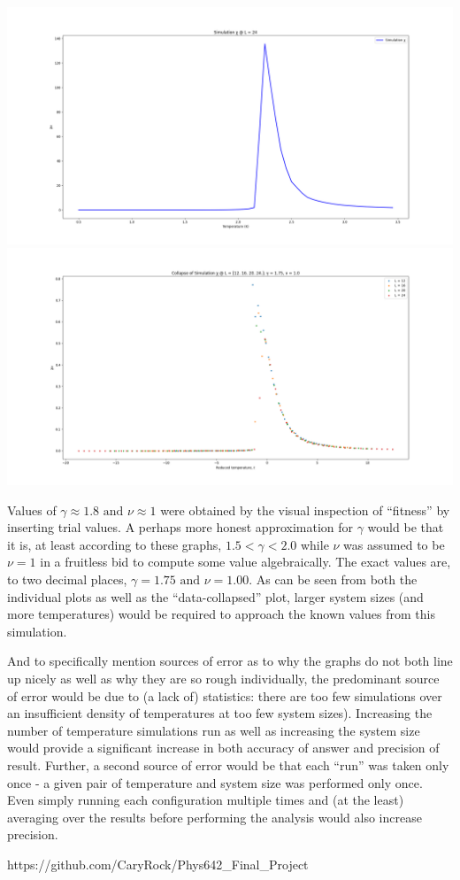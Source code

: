 \documentclass{article}
\begin{document}
    	\includegraphics[width=\textwidth]{D/D-L_24}
    	\includegraphics[width=\textwidth]{D/D-Data_collapse}
		
		Values of $\gamma \approx 1.8 \text{ and } \nu \approx 1 $ were obtained by the visual inspection of ``fitness'' by inserting trial values. A perhaps more honest approximation for $\gamma$ would be that it is, at least according to these graphs, $ 1.5 < \gamma < 2.0 $ while $ \nu $ was assumed to be $ \nu = 1 $ in a fruitless bid to compute some value algebraically. The exact values are, to two decimal places, $ \gamma = 1.75 \text{ and } \nu = 1.00 $. As can be seen from both the individual plots as well as the ``data-collapsed'' plot, larger system sizes (and more temperatures) would be required to approach the known values from this simulation.
		
		And to specifically mention sources of error as to why the graphs do not both line up nicely as well as why they are so rough individually, the predominant source of error would be due to (a lack of) statistics: there are too few simulations over an insufficient density of temperatures at too few system sizes). Increasing the number of temperature simulations run as well as increasing the system size would provide a significant increase in both accuracy of answer and precision of result. Further, a second source of error would be that each ``run'' was taken only once - a given pair of temperature and system size was performed only once. Even simply running each configuration multiple times and (at the least) averaging over the results before performing the analysis would also increase precision. 
		
	\begin{thebibliography}{100}
		 https://github.com/CaryRock/Phys642\_Final\_Project
	\end{thebibliography}
\end{document}
